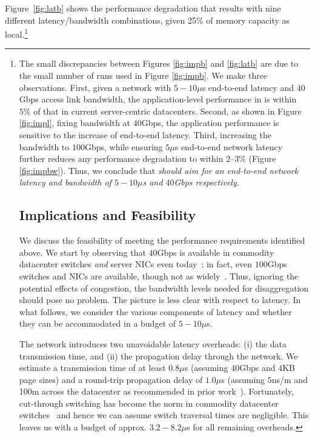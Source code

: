 Figure~\ref{fig:latb} shows the performance degradation that results with nine different latency/bandwidth combinations, given 25\% of memory capacity as local.\footnote{The small discrepancies between Figures \ref{fig:impb} and \ref{fig:latb} are due to the small number of runs used in Figure \ref{fig:impb}. %
We make three observations. First, given a network with $5-10\mu$s end-to-end latency and $40$Gbps access link bandwidth, the application-level performance in \dis is within $5\%$ of that in current server-centric datacenters. 
Second, as shown in Figure \ref{fig:impl}, fixing bandwidth at 40Gbps, the application performance is sensitive to the increase of end-to-end latency.
Third, increasing the bandwidth to $100$Gbps, while ensuring $5\mu$s end-to-end network latency further reduces any performance degradation to within $2$--$3\%$ (Figure \ref{fig:impbw}).
Thus, we conclude that \emph{\dis should aim for an end-to-end network latency and bandwidth of $5-10\mu$s and $40$Gbps respectively.}

\subsection{Implications and Feasibility}
\label{ssec:rtt}

We discuss the feasibility of meeting the performance requirements identified above. We start by observing that $40$Gbps is available in commodity datacenter switches \emph{and} server NICs even today~\cite{40gnic}; in fact, even $100$Gbps switches and NICs are available, though not as widely~\cite{100gnic}.
Thus, ignoring the potential effects of congestion, the bandwidth levels needed for disaggregation should pose no problem.
The picture is less clear with respect to latency. In what follows, we consider the various components of latency and whether they can be accommodated in a budget of $5-10\mu$s. 

The network introduces two unavoidable latency overheads: (i) the data transmission time, and (ii) the propagation delay through the network. We estimate a  transmission time of at least $0.8\mu$s (assuming $40$Gbps and $4$KB page sizes) 
and a round-trip propagation delay of $1.0\mu$s (assuming $5$ns/m and 100m across the datacenter as recommended in prior work~\cite{lowlatency}).
Fortunately, cut-through switching has become the norm in commodity datacenter switches~\cite{arista,broadcom} and hence we can assume switch traversal times are negligible. 
This leaves us with a budget of approx. $3.2-8.2\mu$s for all remaining overheads.

}
